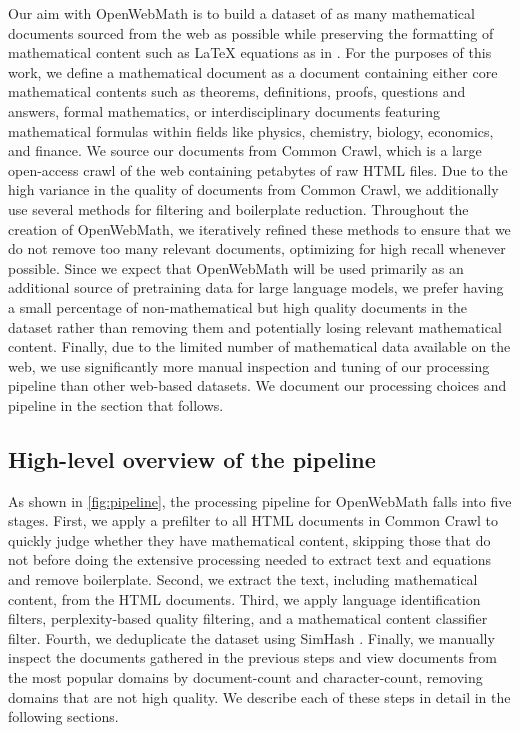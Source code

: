 Our aim with OpenWebMath is to build a dataset of as many mathematical documents sourced from the web as possible while preserving the formatting of mathematical content such as \LaTeX{} equations as in \citet{lewkowycz2022solving}. For the purposes of this work, we define a mathematical document as a document containing either core mathematical contents such as theorems, definitions, proofs, questions and answers, formal mathematics, or interdisciplinary documents featuring mathematical formulas within fields like physics, chemistry, biology, economics, and finance. We source our documents from Common Crawl, which is a large open-access crawl of the web containing petabytes of raw HTML files. Due to the high variance in the quality of documents from Common Crawl, we additionally use several methods for filtering and boilerplate reduction. Throughout the creation of OpenWebMath, we iteratively refined these methods to ensure that we do not remove too many relevant documents, optimizing for high recall whenever possible. Since we expect that OpenWebMath will be used primarily as an additional source of pretraining data for large language models, we prefer having a small percentage of non-mathematical but high quality documents in the dataset rather than removing them and potentially losing relevant mathematical content. Finally, due to the limited number of mathematical data available on the web, we use significantly more manual inspection and tuning of our processing pipeline than other web-based datasets. We document our processing choices and pipeline in the section that follows.

\subsection{High-level overview of the pipeline}

As shown in \autoref{fig:pipeline}, the processing pipeline for OpenWebMath falls into five stages. First, we apply a prefilter to all HTML documents in Common Crawl to quickly judge whether they have mathematical content, skipping those that do not before doing the extensive processing needed to extract text and equations and remove boilerplate. Second, we extract the text, including mathematical content, from the HTML documents. Third, we apply language identification filters, perplexity-based quality filtering, and a mathematical content classifier filter. Fourth, we deduplicate the dataset using SimHash \citep{manku2007near}. Finally, we manually inspect the documents gathered in the previous steps and view documents from the most popular domains by document-count and character-count, removing domains that are not high quality. We describe each of these steps in detail in the following sections.

